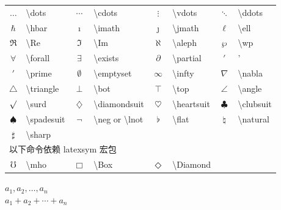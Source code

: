 \documentclass[a4paper]{ctexart}
\begin{document}
    \begin{tabular}{clclclcl}
        \toprule
        $\dots$         & \textbackslash dots       & $\cdots$          & \textbackslash cdots                          &
        $\vdots$        & \textbackslash vdots      & $\ddots$          & \textbackslash ddots                          \\
        $\hbar$         & \textbackslash hbar       & $\imath$          & \textbackslash imath                          &
        $\jmath$        & \textbackslash jmath      & $\ell$            & \textbackslash ell                            \\
        $\Re$           & \textbackslash Re         & $\Im$             & \textbackslash Im                             &
        $\aleph$        & \textbackslash aleph      & $\wp$             & \textbackslash wp                             \\
        $\forall$       & \textbackslash forall     & $\exists$         & \textbackslash exists                         &  
        $\partial$      & \textbackslash partial    & $'$               & '                                             \\ 
        $\prime$        & \textbackslash prime      & $\emptyset$       & \textbackslash emptyset                       &
        $\infty$        & \textbackslash infty      & $\nabla$          & \textbackslash nabla                          \\ 
        $\triangle$     & \textbackslash triangle   & $\bot$            & \textbackslash bot                            &
        $\top$          & \textbackslash top        & $\angle$          & \textbackslash angle                          \\
        $\surd$         & \textbackslash surd       & $\diamondsuit$    & \textbackslash diamondsuit                    &
        $\heartsuit$    & \textbackslash heartsuit  & $\clubsuit$       & \textbackslash clubsuit                       \\ 
        $\spadesuit$    & \textbackslash spadesuit  & $\neg$            & \textbackslash neg or \textbackslash lnot     &
        $\flat$         & \textbackslash flat       & $\natural$        & \textbackslash natural                        \\
        $\sharp$        & \textbackslash sharp                                                                          \\
        \midrule
        \multicolumn{4}{l}{以下命令依赖 latexsym 宏包}\\
        $\mho$          & \textbackslash mho        & $\Box$            & \textbackslash Box                            &
        $\Diamond$      & \textbackslash Diamond                                                                        \\
        \bottomrule
    \end{tabular}
    \flushleft
    $a_1,a_2,\dots,a_n$\\
    $a_1 + a_2 + \cdots + a_n$\par
\end{document}
